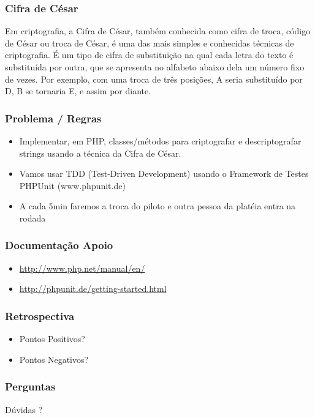 \documentclass{beamer}
\begin{document}
\begin{frame}
	\frametitle{Cifra de César}
	Em criptografia, a Cifra de César, também conhecida como cifra de troca, código de César ou troca de César, é uma das mais simples e conhecidas técnicas de criptografia. É um tipo de cifra de substituição na qual cada letra do texto é substituída por outra, que se apresenta no alfabeto abaixo dela um número fixo de vezes. Por exemplo, com uma troca de três posições, A seria substituído por D, B se tornaria E, e assim por diante.
\end{frame}

\begin{frame}
	\frametitle{Problema / Regras}
	\begin{itemize}
		\item Implementar, em PHP, classes/métodos para criptografar e descriptografar strings usando a técnica da Cifra de César.
		\item Vamos usar TDD (Test-Driven Development) usando o Framework de Testes PHPUnit (www.phpunit.de)
		\item A cada 5min faremos a troca do piloto e outra pessoa da platéia entra na rodada
	\end{itemize}
\end{frame}

\begin{frame}
	\frametitle{Documentação Apoio}
	\begin{itemize}
		\item
		\url{http://www.php.net/manual/en/}
		\item \url{http://phpunit.de/getting-started.html}
	\end{itemize}
\end{frame}

\begin{frame}
	\frametitle{Retrospectiva}
	\begin{itemize}
		\item Pontos Positivos?
		\item Pontos Negativos?
	\end{itemize}
\end{frame}

\begin{frame}
	\frametitle{Perguntas}

	\begin{center}
		\Huge Dúvidas ?
		\vspace{0.5cm}
		\normalsize
	\end{center}
\end{frame}
\end{document}
